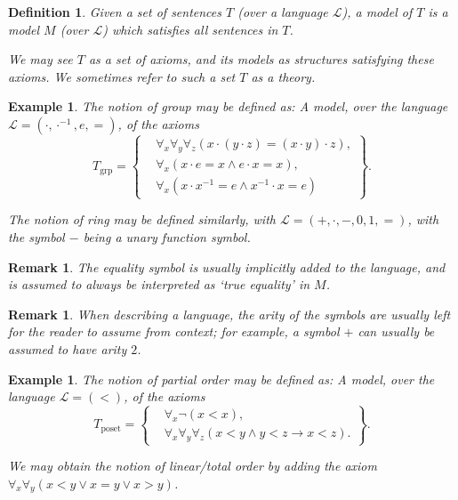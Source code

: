 \documentclass{article}
\newtheorem{remark}[theorem]{Remark}
\newtheorem{example}[theorem]{Example}
\newtheorem{definition}[theorem]{Definition}
\theoremstyle{nonumberplain}
\newcommand{\Lang}{\mathcal{L}}
\begin{document}
\begin{definition}
Given a set of sentences $T$ (over a language $\Lang$), a \emph{model of $T$} is a model $M$ (over $\Lang$) which satisfies all sentences in $T$.

We may see $T$ as a set of axioms, and its models as structures satisfying these axioms. We sometimes refer to such a set $T$ as a \emph{theory}.
\end{definition}

\begin{example}\label{ex:1}
The notion of group may be defined as: A model, over the language $\Lang = (\cdot, \cdot^{-1}, e, =)$, of the axioms
\begin{equation}
T_{\text{grp}} = \left\{
\begin{aligned}
&\forall_x \forall_y \forall_z (x \cdot (y \cdot z) = (x \cdot y) \cdot z),\\
&\forall_x (x \cdot e = x \land e \cdot x = x),\\
&\forall_x (x \cdot x^{-1} = e \land x^{-1} \cdot x = e)
\end{aligned}\right\}.
\end{equation}

The notion of ring may be defined similarly, with $\Lang = (+,\cdot,-,0,1, =)$, with the symbol $-$ being a unary function symbol.
\end{example}

\begin{remark}
The equality symbol is usually implicitly added to the language, and is assumed to always be interpreted as `true equality' in $M$.
\end{remark}

\begin{remark}
When describing a language, the arity of the symbols are usually left for the reader to assume from context; for example, a symbol $+$ can usually be assumed to have arity $2$.
\end{remark}

\begin{example}
The notion of partial order may be defined as: A model, over the language $\Lang = (<)$, of the axioms
\begin{equation}
T_{\text{poset}} = \left\{
\begin{aligned}
&\forall_x \neg(x<x),\\
&\forall_x \forall_y \forall_z (x < y \land y < z \rightarrow x<z).
\end{aligned}\right\}.
\end{equation}

We may obtain the notion of linear/total order by adding the axiom $\forall_x \forall_y (x<y \lor x=y \lor x>y)$.
\end{example}
\end{document}
